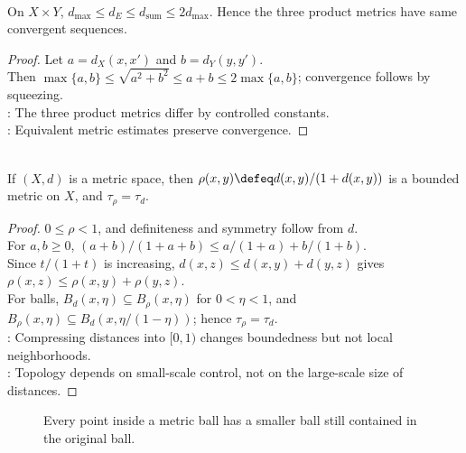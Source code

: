 \begin{proposition} \label{prop:product-metric-comparison} \\
On $X\times Y$, $d_{\max}\leq d_E\leq d_{\mathrm{sum}}\leq2d_{\max}$. Hence the three product metrics have same convergent sequences.
\begin{proof}
Let $a=d_X(x,x')$ and $b=d_Y(y,y')$.\\
Then $\max\{a,b\}\leq\sqrt{a^2+b^2}\leq a+b\leq2\max\{a,b\}$; convergence follows by squeezing.\\
: The three product metrics differ by controlled constants.\\
: Equivalent metric estimates preserve convergence.
\end{proof}
\end{proposition}

\begin{proposition} \label{prop:bounded-compression-metric-same-open-sets} \\
If $(X,d)$ is a metric space, then $\rho(x,y)\defeq d(x,y)/(1+d(x,y))$ is a bounded metric on $X$, and $\tau_\rho=\tau_d$.
\begin{proof}
$0\leq\rho<1$, and definiteness and symmetry follow from $d$.\\
For $a,b\geq0$, $(a+b)/(1+a+b)\leq a/(1+a)+b/(1+b)$.\\
Since $t/(1+t)$ is increasing, $d(x,z)\leq d(x,y)+d(y,z)$ gives $\rho(x,z)\leq\rho(x,y)+\rho(y,z)$.\\
For balls, $B_d(x,\eta)\subseteq B_\rho(x,\eta)$ for $0<\eta<1$, and $B_\rho(x,\eta)\subseteq B_d(x,\eta/(1-\eta))$; hence $\tau_\rho=\tau_d$.\\
: Compressing distances into $[0,1)$ changes boundedness but not local neighborhoods.\\
: Topology depends on small-scale control, not on the large-scale size of distances.
\end{proof}
\end{proposition}

\begin{figure}[H]
  \centering
  
  \caption{Every point inside a metric ball has a smaller ball still contained in the original ball.}
  \label{fig:metric-ball-topology}
\end{figure}

